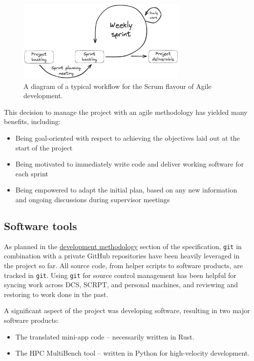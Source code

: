 \begin{figure}[h]
    \centering
    \includegraphics[width=0.75\textwidth]{images/6_project_management/excalidraw_agile.png}
    \caption{A diagram of a typical workflow for the Scrum flavour of Agile development.}
    \label{fig:excalidraw_agile}
\end{figure}

This decision to manage the project with an agile methodology has yielded many benefits, including:

\begin{itemize}
    \item Being goal-oriented with respect to achieving the objectives laid out at the start of the project
    \item Being motivated to immediately write code and deliver working software for each sprint
    \item Being empowered to adapt the initial plan, based on any new information and ongoing discussions during supervisor meetings
\end{itemize}


\subsection{Software tools}
\label{ssec:software-tools}

As planned in the \hyperref[sec:development_methodology]{development methodology} section of the specification, \texttt{git} in combination with a private GitHub repositories have been heavily leveraged in the project so far. All source code, from helper scripts to software products, are tracked in \texttt{git}. Using \texttt{git} for source control management has been helpful for syncing work across DCS, SCRPT, and personal machines, and reviewing and restoring to work done in the past.

A significant aspect of the project was developing software, resulting in two major software products:

\begin{itemize}
    \item The translated mini-app code -- necessarily written in Rust.
    \item The HPC MultiBench tool -- written in Python for high-velocity development.
\end{itemize}

